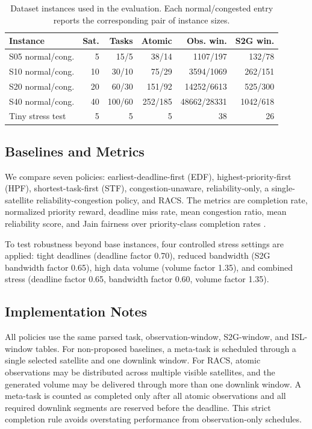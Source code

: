 \documentclass[conference]{IEEEtran}
\begin{document}
\begin{table}[t]
\caption{Dataset instances used in the evaluation. Each normal/congested entry reports the corresponding pair of instance sizes.}
\label{tab:dataset}
\centering
\scriptsize
\begin{tabular}{lrrrrr}
\toprule
Instance & Sat. & Tasks & Atomic & Obs. win. & S2G win.\\
\midrule
S05 normal/cong. & 5 & 15/5 & 38/14 & 1107/197 & 132/78\\
S10 normal/cong. & 10 & 30/10 & 75/29 & 3594/1069 & 262/151\\
S20 normal/cong. & 20 & 60/30 & 151/92 & 14252/6613 & 525/300\\
S40 normal/cong. & 40 & 100/60 & 252/185 & 48662/28331 & 1042/618\\
Tiny stress test & 5 & 5 & 5 & 38 & 26\\
\bottomrule
\end{tabular}
\end{table}

\subsection{Baselines and Metrics}
We compare seven policies: earliest-deadline-first (EDF), highest-priority-first (HPF), shortest-task-first (STF), congestion-unaware, reliability-only, a single-satellite reliability-congestion policy, and RACS. The metrics are completion rate, normalized priority reward, deadline miss rate, mean congestion ratio, mean reliability score, and Jain fairness over priority-class completion rates \cite{jain1984fairness}.

To test robustness beyond base instances, four controlled stress settings are applied: tight deadlines (deadline factor 0.70), reduced bandwidth (S2G bandwidth factor 0.65), high data volume (volume factor 1.35), and combined stress (deadline factor 0.65, bandwidth factor 0.60, volume factor 1.35).

\subsection{Implementation Notes}
All policies use the same parsed task, observation-window, S2G-window, and ISL-window tables. For non-proposed baselines, a meta-task is scheduled through a single selected satellite and one downlink window. For RACS, atomic observations may be distributed across multiple visible satellites, and the generated volume may be delivered through more than one downlink window. A meta-task is counted as completed only after all atomic observations and all required downlink segments are reserved before the deadline. This strict completion rule avoids overstating performance from observation-only schedules.
\end{document}
